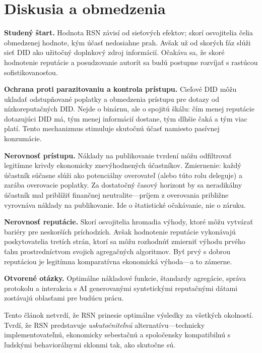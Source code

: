 \documentclass[11pt,a4paper,twocolumn]{article}
\begin{document}
\section{Diskusia a obmedzenia}

\textbf{Studený štart.} Hodnota RSN závisí od sieťových efektov; skorí osvojitelia čelia obmedzenej hodnote, kým účasť nedosiahne prah. Avšak už od skorých fáz slúži sieť DID ako užitočný doplnkový zdroj informácií. Očakáva sa, že skoré hodnotenie reputácie a posudzovanie autorít sa budú postupne rozvíjať s rastúcou sofistikovanosťou.

\textbf{Ochrana proti parazitovaniu a kontrola prístupu.} Cieľové DID môžu ukladať odstupňované poplatky a obmedzenia prístupu pre dotazy od nízkoreputačných DID. Nejde o binárnu, ale o spojitú škálu: čím menej reputácie dotazujúci DID má, tým menej informácií dostane, tým dlhšie čaká a tým viac platí. Tento mechanizmus stimuluje skutočnú účasť namiesto pasívnej konzumácie.

\textbf{Nerovnosť prístupu.} Náklady na publikovanie tvrdení môžu odfiltrovať legitímne krivdy ekonomicky znevýhodnených účastníkov. Zmiernenie: každý účastník súčasne slúži ako potenciálny overovateľ (alebo túto rolu deleguje) a zarába overovacie poplatky. Za dostatočný časový horizont by sa neradikálny účastník mal priblížiť finančnej neutralite---príjem z overovania približne vyrovnáva náklady na publikovanie. Ide o štatistické očakávanie, nie o záruku.

\textbf{Nerovnosť reputácie.} Skorí osvojitelia hromadia výhody, ktoré môžu vytvárať bariéry pre neskorších príchodzích. Avšak hodnotenie reputácie vykonávajú poskytovatelia tretích strán, ktorí sa môžu rozhodnúť zmierniť výhodu prvého ťahu prostredníctvom svojich agregačných algoritmov. Byť prvý s dobrou reputáciou je legitímna komparatívna ekonomická výhoda---a to zámerne.

\textbf{Otvorené otázky.} Optimálne nákladové funkcie, štandardy agregácie, správa protokolu a interakcia s AI generovanými syntetickými reputačnými dátami zostávajú oblasťami pre budúcu prácu.

Tento článok netvrdí, že RSN prinesie optimálne výsledky za všetkých okolností. Tvrdí, že RSN predstavuje \emph{uskutočniteľnú} alternatívu---technicky implementovateľnú, ekonomicky sebestačnú a spoločensky kompatibilnú s ľudskými behaviorálnymi sklonmi tak, ako skutočne sú.
\end{document}
